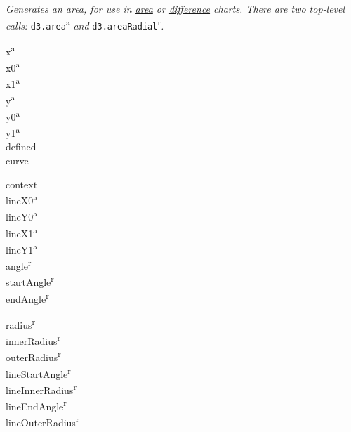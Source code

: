 \textit{Generates an area, for use in \href{https://observablehq.com/@d3/area-chart}{area} or \href{https://observablehq.com/@d3/difference-chart}{difference} charts. There are two top-level calls: }\texttt{d3.area}\textsuperscript{a}\textit{ and }\texttt{d3.areaRadial}\textsuperscript{r}\textit{.}\\
{\footnotesize
\begin{minipage}[t]{1.8cm}
    x\textsuperscript{a}\\
    x0\textsuperscript{a}\\
    x1\textsuperscript{a}\\
    y\textsuperscript{a}\\
    y0\textsuperscript{a}\\
    y1\textsuperscript{a}\\
    defined\\
    curve
\end{minipage}
\begin{minipage}[t]{2.0cm}
    context\\
    lineX0\textsuperscript{a}\\
    lineY0\textsuperscript{a}\\
    lineX1\textsuperscript{a}\\
    lineY1\textsuperscript{a}\\
    angle\textsuperscript{r}\\
    startAngle\textsuperscript{r}\\
    endAngle\textsuperscript{r}
\end{minipage}
\begin{minipage}[t]{2.0cm}
    radius\textsuperscript{r}\\
    innerRadius\textsuperscript{r}\\
    outerRadius\textsuperscript{r}\\
    lineStartAngle\textsuperscript{r}\\
    lineInnerRadius\textsuperscript{r}\\
    lineEndAngle\textsuperscript{r}\\
    lineOuterRadius\textsuperscript{r}
\end{minipage}
}



